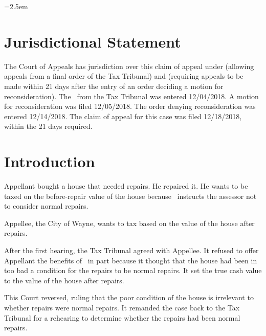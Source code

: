\documentclass[12pt,\documentclassflag]{michiganCourtOfAppealsBrief}
\def\mathieuGast{\pincite[l]{MCL}{211.27(2)}}
\begin{document}
\newpage
\tableofauthorities

\pagestyle{plain}



\parindent=2.5em
\doublespacing

\section{Jurisdictional Statement}
 
The Court of Appeals has jurisdiction over this claim of appeal under  (allowing appeals from a final order of the Tax Tribunal) and  (requiring appeals to be made within 21 days after the entry of an order deciding a motion for reconsideration). The \FOJ\ from the Tax Tribunal was entered 12/04/2018. A motion for reconsideration was filed 12/05/2018. The order denying reconsideration was entered 12/14/2018. The claim of appeal for this case was filed 12/18/2018, within the 21 days required.

\section{Introduction}

Appellant bought a house that needed repairs. He repaired it. He wants to be taxed on the before-repair value of the house because  \mathieuGast\ instructs the assessor not to consider normal repairs. 

Appellee, the City of Wayne, wants to tax based on the value of the house after repairs.

After the first hearing, the Tax Tribunal agreed with Appellee. It refused to offer Appellant the benefits of \mathieuGast\ in part because it thought that the house had been in too bad a condition for the repairs to be normal repairs. It set the true cash value to the value of the house after repairs.

This Court reversed, ruling that the poor condition of the house is irrelevant to whether repairs were normal repairs. It remanded the case back to the Tax Tribunal for a rehearing to determine whether the repairs had been normal repairs. 
\end{document}
